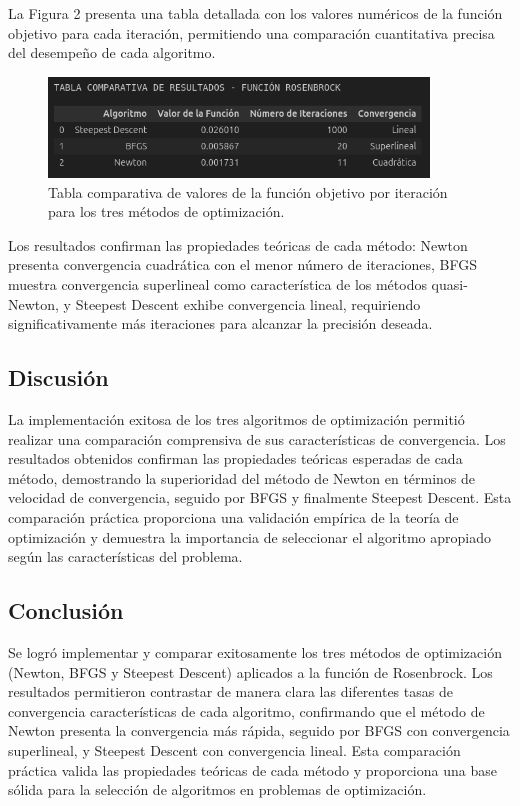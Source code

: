 \documentclass{article}
\begin{document}
La Figura 2 presenta una tabla detallada con los valores numéricos de la función objetivo para cada iteración, permitiendo una comparación cuantitativa precisa del desempeño de cada algoritmo.

\begin{figure}[H]
    \centering
    \includegraphics[width=0.9\textwidth]{images/6_tabla_resultados.png}
    \caption{Tabla comparativa de valores de la función objetivo por iteración para los tres métodos de optimización.}
\end{figure}

Los resultados confirman las propiedades teóricas de cada método: Newton presenta convergencia cuadrática con el menor número de iteraciones, BFGS muestra convergencia superlineal como característica de los métodos quasi-Newton, y Steepest Descent exhibe convergencia lineal, requiriendo significativamente más iteraciones para alcanzar la precisión deseada.

\subsection{Discusión}

La implementación exitosa de los tres algoritmos de optimización permitió realizar una comparación comprensiva de sus características de convergencia. Los resultados obtenidos confirman las propiedades teóricas esperadas de cada método, demostrando la superioridad del método de Newton en términos de velocidad de convergencia, seguido por BFGS y finalmente Steepest Descent. Esta comparación práctica proporciona una validación empírica de la teoría de optimización y demuestra la importancia de seleccionar el algoritmo apropiado según las características del problema.

\subsection{Conclusión}

Se logró implementar y comparar exitosamente los tres métodos de optimización (Newton, BFGS y Steepest Descent) aplicados a la función de Rosenbrock. Los resultados permitieron contrastar de manera clara las diferentes tasas de convergencia características de cada algoritmo, confirmando que el método de Newton presenta la convergencia más rápida, seguido por BFGS con convergencia superlineal, y Steepest Descent con convergencia lineal. Esta comparación práctica valida las propiedades teóricas de cada método y proporciona una base sólida para la selección de algoritmos en problemas de optimización.
\end{document}
